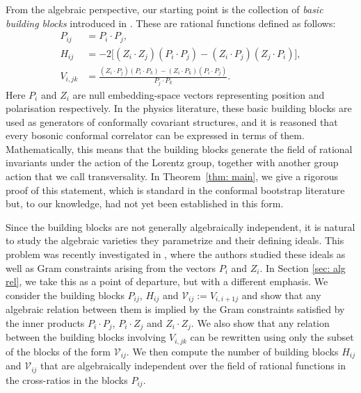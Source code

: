 \documentclass[12pt,a4paper]{extarticle}
\theoremstyle{definition}
\begin{document}
\medskip
From the algebraic perspective, our starting point is the collection of \emph{basic building blocks} introduced in \cite{CPPR}. These are rational functions  defined as follows:
\begin{equation}\label{eq: confblocks intro}
    \begin{aligned}
        P_{ij} & =P_i\cdot P_j, \\ 
H_{ij} & =-2\big[(Z_i\cdot Z_j)(P_i\cdot P_j)
-(Z_i\cdot P_j)(Z_j\cdot P_i)\big],\\
V_{i,jk}
& =
\frac{(Z_i\cdot P_j)(P_i\cdot P_k)
-(Z_i\cdot P_k)(P_i\cdot P_j)}
{P_j\cdot P_k}.
    \end{aligned}
\end{equation}
Here $P_i$ and $Z_i$ are null embedding-space vectors representing position and polarisation respectively. In the physics literature, these basic building blocks are used as generators of conformally covariant structures, and it is reasoned that every bosonic conformal correlator can be expressed in terms of them. Mathematically, this means that the building blocks generate the field of rational invariants under the action of the Lorentz group, together with another group action that we call transversality. In Theorem~\ref{thm: main}, we give a rigorous proof of this statement, which is standard in the conformal bootstrap literature but, to our knowledge, had not yet been established in this form.
\medskip

Since the building blocks are not generally algebraically independent, it is natural to study the algebraic varieties they parametrize and their defining ideals.
This problem was recently investigated in \cite{MSS}, where the authors studied these ideals as well as Gram constraints arising from the vectors $P_i$ and $Z_i$.
In Section \ref{sec: alg rel}, we take this as a point of departure, but with a different emphasis. We consider the building blocks $P_{ij}$, $H_{ij}$ and $\mathcal{V}_{ij}:=V_{i,i+1j}$ and show that any algebraic relation between them is implied by the Gram constraints satisfied by the inner products $P_i\cdot P_j$, $P_i\cdot Z_j$ and $Z_i\cdot Z_j$.
We also show that any relation between the building blocks involving $V_{i,jk}$ can be rewritten using only the subset of the blocks of the form $\mathcal{V}_{ij}$. 
We then compute the number of building blocks $H_{ij}$ and $\mathcal{V}_{ij}$ that are algebraically independent over the field of rational functions in the cross-ratios in the blocks $P_{ij}$.

\medskip
\end{document}
